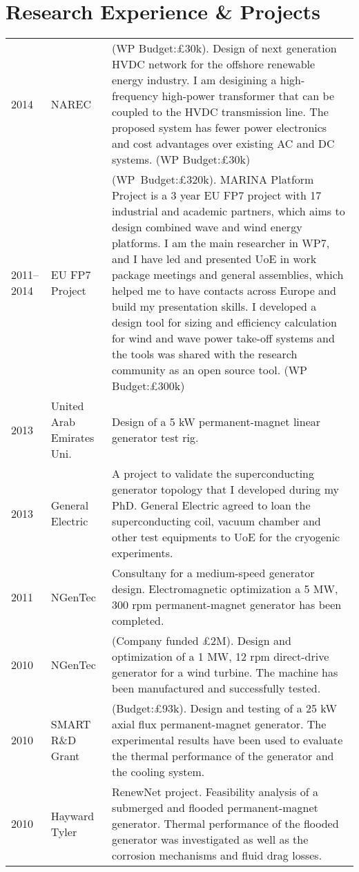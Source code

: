 \documentclass[a4paper,12pt]{article}
\begin{document}
\clearpage

\section{Research Experience \& Projects}
\begin{longtable}{lp{3cm}p{12cm}}
2014 & NAREC & (WP Budget:£30k). Design of next generation HVDC network for the offshore renewable energy industry. I am desigining a high-frequency high-power transformer that can be coupled to the HVDC transmission line. The proposed system has fewer power electronics and cost advantages over existing AC and DC systems. (WP Budget:£30k)\\
2011--2014 & EU FP7 Project &  (WP~Budget:£320k). MARINA Platform Project is a 3 year EU FP7 project with 17 industrial and academic partners, which aims to design combined wave and wind energy platforms. I am the main researcher in WP7, and I have led and presented UoE in work package meetings and general assemblies, which helped me to have contacts across Europe and build my presentation skills. I developed a design tool for sizing and efficiency calculation for wind and wave power take-off systems and the tools was shared with the research community as an open source tool. (WP Budget:£300k)\\
2013 & United Arab Emirates Uni. & Design of a 5 kW permanent-magnet linear generator test rig.\\
2013 & General Electric & A project to validate the superconducting generator topology that I developed during my PhD. General Electric agreed to loan the superconducting coil, vacuum chamber and other test equipments to UoE for the cryogenic experiments.\\
2011 & NGenTec & Consultany for a medium-speed generator design. Electromagnetic optimization a 5 MW, 300 rpm permanent-magnet generator has been completed.\\
2010 & NGenTec & (Company funded £2M). Design and optimization of a 1 MW, 12 rpm direct-drive generator for a wind turbine. The machine has been manufactured and successfully tested.\\
2010 & SMART R\&D Grant & (Budget:£93k). Design and testing of a 25 kW axial flux permanent-magnet generator. The experimental results have been used to evaluate the thermal performance of the generator and the cooling system.\\
2010 & Hayward Tyler & RenewNet project. Feasibility analysis of a submerged and flooded permanent-magnet generator. Thermal performance of the flooded generator was investigated as well as the corrosion mechanisms and fluid drag losses.\\

\end{longtable}
\end{document}

